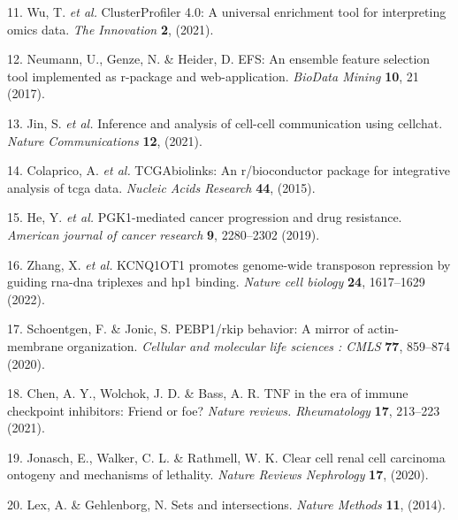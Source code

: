 \documentclass[
]{article}
\newenvironment{cslreferences}%
  {}%
  {\par}
\begin{document}
\begin{cslreferences}
\leavevmode\hypertarget{ref-ClusterprofilerWuTi2021}{}%
11. Wu, T. \emph{et al.} ClusterProfiler 4.0: A universal enrichment tool for interpreting omics data. \emph{The Innovation} \textbf{2}, (2021).

\leavevmode\hypertarget{ref-EfsAnEnsemblNeuman2017}{}%
12. Neumann, U., Genze, N. \& Heider, D. EFS: An ensemble feature selection tool implemented as r-package and web-application. \emph{BioData Mining} \textbf{10}, 21 (2017).

\leavevmode\hypertarget{ref-InferenceAndAJinS2021}{}%
13. Jin, S. \emph{et al.} Inference and analysis of cell-cell communication using cellchat. \emph{Nature Communications} \textbf{12}, (2021).

\leavevmode\hypertarget{ref-TcgabiolinksAColapr2015}{}%
14. Colaprico, A. \emph{et al.} TCGAbiolinks: An r/bioconductor package for integrative analysis of tcga data. \emph{Nucleic Acids Research} \textbf{44}, (2015).

\leavevmode\hypertarget{ref-Pgk1MediatedCHeYu2019}{}%
15. He, Y. \emph{et al.} PGK1-mediated cancer progression and drug resistance. \emph{American journal of cancer research} \textbf{9}, 2280--2302 (2019).

\leavevmode\hypertarget{ref-Kcnq1ot1PromotZhang2022}{}%
16. Zhang, X. \emph{et al.} KCNQ1OT1 promotes genome-wide transposon repression by guiding rna-dna triplexes and hp1 binding. \emph{Nature cell biology} \textbf{24}, 1617--1629 (2022).

\leavevmode\hypertarget{ref-Pebp1RkipBehaSchoen2020}{}%
17. Schoentgen, F. \& Jonic, S. PEBP1/rkip behavior: A mirror of actin-membrane organization. \emph{Cellular and molecular life sciences : CMLS} \textbf{77}, 859--874 (2020).

\leavevmode\hypertarget{ref-TnfInTheEraChen2021}{}%
18. Chen, A. Y., Wolchok, J. D. \& Bass, A. R. TNF in the era of immune checkpoint inhibitors: Friend or foe? \emph{Nature reviews. Rheumatology} \textbf{17}, 213--223 (2021).

\leavevmode\hypertarget{ref-ClearCellRenaJonasc2020}{}%
19. Jonasch, E., Walker, C. L. \& Rathmell, W. K. Clear cell renal cell carcinoma ontogeny and mechanisms of lethality. \emph{Nature Reviews Nephrology} \textbf{17}, (2020).

\leavevmode\hypertarget{ref-SetsAndIntersLexA2014}{}%
20. Lex, A. \& Gehlenborg, N. Sets and intersections. \emph{Nature Methods} \textbf{11}, (2014).
\end{cslreferences}
\end{document}

